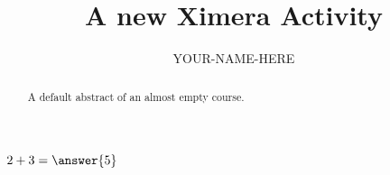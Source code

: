 \documentclass{ximera}
\title{A new Ximera Activity}
\author{YOUR-NAME-HERE}
\begin{document}
\begin{abstract}
    A default abstract of an almost empty course.
\end{abstract}
\maketitle


\begin{exercise}
    $2+3=\answer{5}$
\end{exercise}
\end{document}
